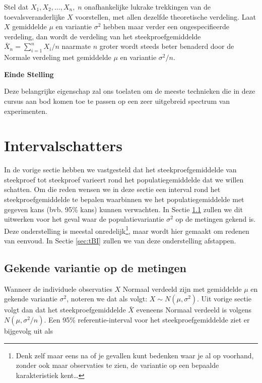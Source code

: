 \documentclass[
  12pt,dutch,coursenotes]{book}
\theoremstyle{definition}
\theoremstyle{definition}
\theoremstyle{definition}
\theoremstyle{remark}
\begin{document}
Stel dat \(X_1, X_2, \dots, X_n, \; n\) onafhankelijke lukrake trekkingen van
de toevalsveranderlijke \(X\) voorstellen, met allen dezelfde theoretische
verdeling. Laat \(X\) gemiddelde \(\mu\) en variantie \(\sigma^2\) hebben maar
verder een ongespecifieerde verdeling, dan wordt de verdeling van het
steekproefgemiddelde \(\bar{X}_n = {\sum_{i=1}^{n} X_i}/{n}\) naarmate \(n\)
groter wordt steeds beter benaderd door de Normale verdeling met gemiddelde \(\mu\) en variantie \(\sigma^2/n.\)

\textbf{Einde Stelling}

Deze belangrijke eigenschap zal ons toelaten om de meeste technieken die in deze cursus aan bod komen toe te passen op een zeer uitgebreid spectrum van experimenten.

\hypertarget{intervalschatters}{%
\section{Intervalschatters}\label{intervalschatters}}

In de vorige sectie hebben we vastgesteld dat het steekproefgemiddelde van
steekproef tot steekproef varieert rond het populatiegemiddelde dat we
willen schatten.
Om die reden wensen we in deze sectie een interval rond het
steekproefgemiddelde te bepalen waarbinnen we het populatiegemiddelde met
gegeven kans (bvb. 95\% kans) kunnen verwachten.
In Sectie \ref{subsec:bigek} zullen we dit uitwerken voor het geval waar de populatievariantie \(\sigma^2\)
op de metingen gekend is.
Deze onderstelling is meestal onredelijk\footnote{Denk zelf maar eens na of je gevallen kunt bedenken waar je al op voorhand,
  zonder ook maar observaties te zien, de variantie op een bepaalde
  karakteristiek kent\ldots{}}, maar wordt hier gemaakt om redenen van eenvoud.
In Sectie \ref{sec:tBI} zullen we van deze onderstelling afstappen.

\hypertarget{subsec:bigek}{%
\subsection{Gekende variantie op de metingen}\label{subsec:bigek}}

Wanneer de individuele observaties \(X\) Normaal verdeeld zijn met gemiddelde \(\mu\) en gekende variantie \(\sigma^2\), noteren we dat als volgt: \(X\sim N(\mu,\sigma^2)\).
Uit vorige sectie volgt dan dat het steekproefgemiddelde \(\bar{X}\) eveneens Normaal verdeeld is volgens \(N(\mu,\sigma^2/n)\). Een 95\% referentie-interval voor het steekproefgemiddelde ziet er bijgevolg uit als
\end{document}
